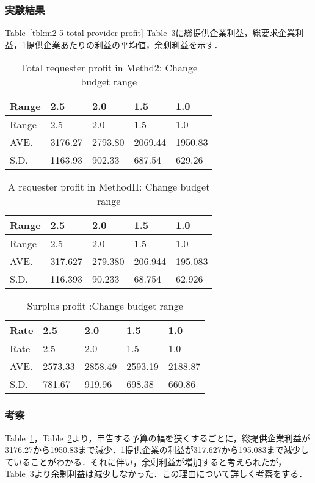 \hypertarget{ux5b9fux9a13ux7d50ux679c-7}{%
\subsubsection{実験結果}\label{ux5b9fux9a13ux7d50ux679c-7}}

Table~\ref{tbl:m2-5-total-provider-profit}-Table~\ref{tbl:m2-5-surplus-profit}に総提供企業利益，総要求企業利益，1提供企業あたりの利益の平均値，余剰利益を示す．

\hypertarget{tbl:m2-5-total-requester-profit}{}
\begin{longtable}[H]{@{}lllll@{}}
\caption{\label{tbl:m2-5-total-requester-profit}Total requester profit
in Methd2: Change budget range}\tabularnewline
\toprule
Range & 2.5 & 2.0 & 1.5 & 1.0\tabularnewline
\midrule
\endfirsthead
\toprule
Range & 2.5 & 2.0 & 1.5 & 1.0\tabularnewline
\midrule
\endhead
AVE. & 3176.27 & 2793.80 & 2069.44 & 1950.83\tabularnewline
S.D. & 1163.93 & 902.33 & 687.54 & 629.26\tabularnewline
\bottomrule
\end{longtable}

\hypertarget{tbl:m2-5-requester-profit}{}
\begin{longtable}[H]{@{}lllll@{}}
\caption{\label{tbl:m2-5-requester-profit}A requester profit in
MethodII: Change budget range}\tabularnewline
\toprule
Range & 2.5 & 2.0 & 1.5 & 1.0\tabularnewline
\midrule
\endfirsthead
\toprule
Range & 2.5 & 2.0 & 1.5 & 1.0\tabularnewline
\midrule
\endhead
AVE. & 317.627 & 279.380 & 206.944 & 195.083\tabularnewline
S.D. & 116.393 & 90.233 & 68.754 & 62.926\tabularnewline
\bottomrule
\end{longtable}

\hypertarget{tbl:m2-5-surplus-profit}{}
\begin{longtable}[H]{@{}lllll@{}}
\caption{\label{tbl:m2-5-surplus-profit}Surplus profit :Change budget
range}\tabularnewline
\toprule
Rate & 2.5 & 2.0 & 1.5 & 1.0\tabularnewline
\midrule
\endfirsthead
\toprule
Rate & 2.5 & 2.0 & 1.5 & 1.0\tabularnewline
\midrule
\endhead
AVE. & 2573.33 & 2858.49 & 2593.19 & 2188.87\tabularnewline
S.D. & 781.67 & 919.96 & 698.38 & 660.86\tabularnewline
\bottomrule
\end{longtable}

\hypertarget{ux8003ux5bdf-8}{%
\subsubsection{考察}\label{ux8003ux5bdf-8}}

Table~\ref{tbl:m2-5-total-requester-profit}，Table~\ref{tbl:m2-5-requester-profit}より，申告する予算の幅を狭くするごとに，総提供企業利益が3176.27から1950.83まで減少．1提供企業の利益が317.627から195.083まで減少していることがわかる．それに伴い，余剰利益が増加すると考えられたが，Table~\ref{tbl:m2-5-surplus-profit}より余剰利益は減少しなかった．この理由について詳しく考察をする．

